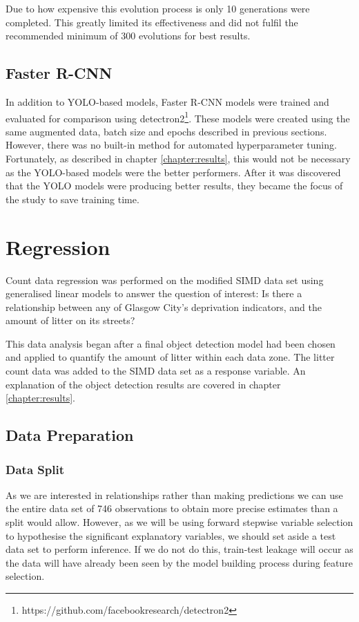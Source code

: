\documentclass{thesis}
\begin{document}
Due to how expensive this evolution process is only 10 generations were completed. This greatly limited its effectiveness and did not fulfil the recommended minimum of 300 evolutions for best results\cite{yolov5-hyperparam}.

\subsection{Faster R-CNN}

In addition to YOLO-based models, Faster R-CNN models were trained and evaluated for comparison using detectron2\footnote{https://github.com/facebookresearch/detectron2}. These models were created using the same augmented data, batch size and epochs described in previous sections. However, there was no built-in method for automated hyperparameter tuning. Fortunately, as described in chapter \ref{chapter:results}, this would not be necessary as the YOLO-based models were the better performers. After it was discovered that the YOLO models were producing better results, they became the focus of the study to save training time.

\section{Regression}

Count data regression was performed on the modified SIMD data set using generalised linear models to answer the question of interest: Is there a relationship between any of Glasgow City's deprivation indicators, and the amount of litter on its streets?

This data analysis began after a final object detection model had been chosen and applied to quantify the amount of litter within each data zone. The litter count data was added to the SIMD data set as a response variable. An explanation of the object detection results are covered in chapter \ref{chapter:results}. 

\subsection{Data Preparation}

\subsubsection{Data Split}

As we are interested in relationships rather than making predictions we can use the entire data set of 746 observations to obtain more precise estimates than a split would allow. However, as we will be using forward stepwise variable selection to hypothesise the significant explanatory variables, we should set aside a test data set to perform inference. If we do not do this, train-test leakage will occur as the data will have already been seen by the model building process during feature selection.
\end{document}
